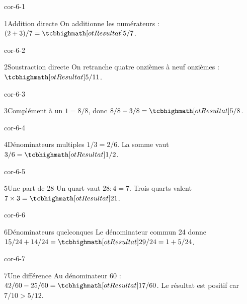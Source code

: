\clearpage\pagestyle{otMain}\setlength{\otBlocEspacement}{2.5mm}\fontsize{11}{15}\selectfont{}
\begin{blocLivre}{cor-6-1}\begin{corrige}{1}{Addition directe}
On additionne les numérateurs : $(2+3)/7=\res{5/7}$.
\end{corrige}\end{blocLivre}
\begin{blocLivre}{cor-6-2}\begin{corrige}{2}{Soustraction directe}
On retranche quatre onzièmes à neuf onzièmes : $\res{5/11}$.
\end{corrige}\end{blocLivre}
\begin{blocLivre}{cor-6-3}\begin{corrige}{3}{Complément à un}
$1=8/8$, donc $8/8-3/8=\res{5/8}$.
\end{corrige}\end{blocLivre}
\begin{blocLivre}{cor-6-4}\begin{corrige}{4}{Dénominateurs multiples}
$1/3=2/6$. La somme vaut $3/6=\res{1/2}$.
\end{corrige}\end{blocLivre}
\begin{blocLivre}{cor-6-5}\begin{corrige}{5}{Une part de 28}
Un quart vaut $28:4=7$. Trois quarts valent $7\times3=\res{21}$.
\end{corrige}\end{blocLivre}
\begin{blocLivre}{cor-6-6}\begin{corrige}{6}{Dénominateurs quelconques}
Le dénominateur commun 24 donne $15/24+14/24=\res{29/24=1+5/24}$.
\end{corrige}\end{blocLivre}
\begin{blocLivre}{cor-6-7}\begin{corrige}{7}{Une différence}
Au dénominateur 60 : $42/60-25/60=\res{17/60}$. Le résultat est positif car $7/10>5/12$.
\end{corrige}\end{blocLivre}
